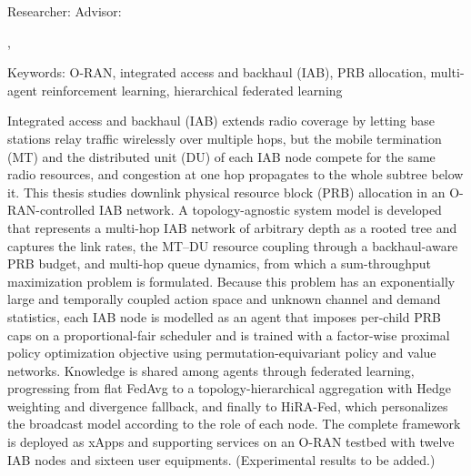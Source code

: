 \begin{EnAbstract}
    \begin{EnAbstractItems}
        \noindent Researcher: \myEname \hfill Advisor: \advisorEname

        \noindent \deptEname, \univEname

        \noindent Keywords: O-RAN, integrated access and backhaul (IAB), PRB allocation, multi-agent reinforcement learning, hierarchical federated learning

    \end{EnAbstractItems}

    \begin{EnAbstractDescription}
        Integrated access and backhaul (IAB) extends radio coverage by letting base stations relay traffic wirelessly over multiple hops, but the mobile termination (MT) and the distributed unit (DU) of each IAB node compete for the same radio resources, and congestion at one hop propagates to the whole subtree below it. This thesis studies downlink physical resource block (PRB) allocation in an O-RAN-controlled IAB network. A topology-agnostic system model is developed that represents a multi-hop IAB network of arbitrary depth as a rooted tree and captures the link rates, the MT--DU resource coupling through a backhaul-aware PRB budget, and multi-hop queue dynamics, from which a sum-throughput maximization problem is formulated. Because this problem has an exponentially large and temporally coupled action space and unknown channel and demand statistics, each IAB node is modelled as an agent that imposes per-child PRB caps on a proportional-fair scheduler and is trained with a factor-wise proximal policy optimization objective using permutation-equivariant policy and value networks. Knowledge is shared among agents through federated learning, progressing from flat FedAvg to a topology-hierarchical aggregation with Hedge weighting and divergence fallback, and finally to HiRA-Fed, which personalizes the broadcast model according to the role of each node. The complete framework is deployed as xApps and supporting services on an O-RAN testbed with twelve IAB nodes and sixteen user equipments. (Experimental results to be added.)
    \end{EnAbstractDescription}

\end{EnAbstract}
